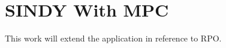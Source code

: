 \documentclass[letterpaper, preprint, paper,11pt]{AAS}	%
\begin{document}
\section{SINDY With MPC}
This work will extend the application in reference  to RPO.





\end{document}
